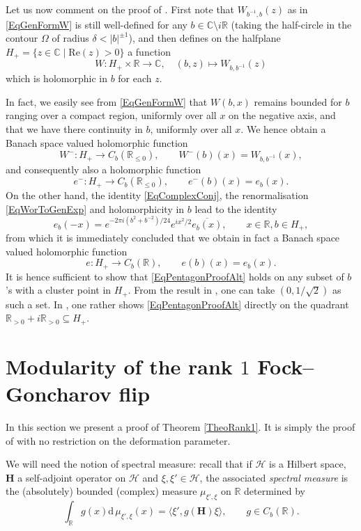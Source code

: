 \documentclass[11pt, reqno]{amsart}
\theoremstyle{definition}
\numberwithin{equation}{section}
\def\C{\mathbb C}
\def\R{\mathbb R}
\newcommand{\Hsp}{\mathcal{H}}
\newcommand{\rd}{\mathrm{d}\!\,}
\newcommand{\Hb}{\mathbf{H}}
\newcommand{\Ree}{\mathrm{Re}}
\begin{document}
Let us now comment on the proof of \cite{FKV01}. First note that $W_{b^{-1},b}(z)$ as in \eqref{EqGenFormW} is still well-defined for any $b\in \C\setminus i\R$ (taking the half-circle in the contour $\Omega$ of radius $\delta < |b|^{\pm1}$), and then defines on the halfplane $H_+ = \{z\in \C\mid \Ree(z)>0\}$ a function 
\[
W\colon  H_+ \times \R \rightarrow \C,\quad (b,z) \mapsto W_{b,b^{-1}}(z) 
\]
which is holomorphic in $b$ for each $z$. 

In fact, we easily see from \eqref{EqGenFormW}  that $W(b,x)$ remains bounded for $b$ ranging over a compact region, uniformly over all $x$ on the negative axis, and that we have there continuity in $b$,  uniformly over all $x$. We hence obtain a Banach space valued holomorphic function 
\[
W^-\colon  H_+ \rightarrow C_b(\R_{\leq 0}),\qquad W^-(b)(x) = W_{b,b^{-1}}(x),
\]
and consequently also a holomorphic function
\[
e^-\colon  H_+ \rightarrow C_b(\R_{\leq 0}),\qquad e^-(b)(x) = e_{b}(x).
\]
On the other hand, the identity \eqref{EqComplexConj}, the renormalisation \eqref{EqWorToGenExp} and holomorphicity in $b$ lead to the identity
\[
e_{b}(-x) = e^{-2\pi i(b^2+b^{-2})/24}e^{ix^2/2}\overline{e_{\overline{b}}(x)},\qquad x\in \R,b\in H_+,
\]
from which it is immediately concluded that we obtain in fact a Banach space valued holomorphic function 
\[
e\colon  H_+ \rightarrow C_b(\R),\qquad e(b)(x) = e_b(x).
\]
It is hence sufficient to show that \eqref{EqPentagonProofAlt} holds on any subset of $b$'s with a cluster point in $H_+$. From the result in \cite[Theorem 6.1]{Wor00}, one can take $(0,1/\sqrt{2})$ as such a set. In \cite[Section 6]{FKV01}, one rather shows \eqref{EqPentagonProofAlt} directly on the quadrant $\R_{>0} + i\R_{>0} \subseteq H_+$.





\section{Modularity of the rank  \texorpdfstring{$1$}{1} Fock--Goncharov flip}\label{SecModAxB}



In this section we present a proof of Theorem \ref{TheoRank1}. It is simply the proof of \cite[Proposition 2.3]{WZ02} with no restriction on the deformation parameter. 

We will need the notion of spectral measure: recall that if $\Hsp$ is a Hilbert space, $\Hb$ a self-adjoint operator on $\Hsp$ and $\xi,\xi'\in \Hsp$, the associated \emph{spectral measure} is the (absolutely) bounded (complex) measure $\mu_{\xi',\xi}$ on $\R$ determined by 
\[
\int_{\R} g(x) \rd \mu_{\xi',\xi}(x) = \langle \xi',g(\Hb)\xi\rangle,\qquad g \in C_b(\R). 
\]
\end{document}
